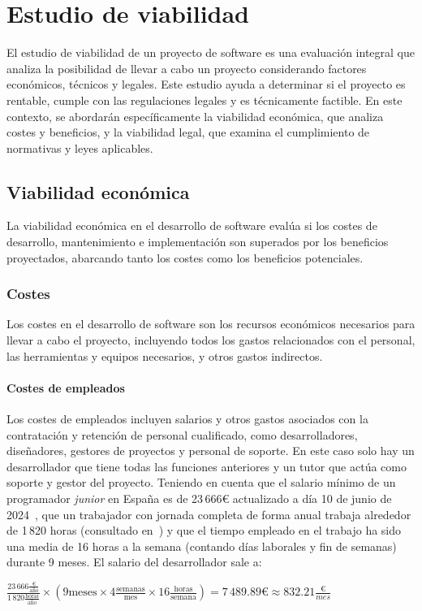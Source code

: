 \section{Estudio de viabilidad}
El estudio de viabilidad de un proyecto de software es una evaluación integral que analiza la posibilidad de llevar a cabo un proyecto considerando factores económicos, técnicos y legales. Este estudio ayuda a determinar si el proyecto es rentable, cumple con las regulaciones legales y es técnicamente factible. En este contexto, se abordarán específicamente la viabilidad económica, que analiza costes y beneficios, y la viabilidad legal, que examina el cumplimiento de normativas y leyes aplicables.

\subsection{Viabilidad económica}
La viabilidad económica en el desarrollo de software evalúa si los costes de desarrollo, mantenimiento e implementación son superados por los beneficios proyectados, abarcando tanto los costes como los beneficios potenciales.

\subsubsection{Costes}
Los costes en el desarrollo de software son los recursos económicos necesarios para llevar a cabo el proyecto, incluyendo todos los gastos relacionados con el personal, las herramientas y equipos necesarios, y otros gastos indirectos.

\paragraph{Costes de empleados}

Los costes de empleados incluyen salarios y otros gastos asociados con la contratación y retención de personal cualificado, como desarrolladores, diseñadores, gestores de proyectos y personal de soporte. En este caso solo hay un desarrollador que tiene todas las funciones anteriores y un tutor que actúa como soporte y gestor del proyecto. Teniendo en cuenta que el salario mínimo de un programador \textit{junior} en España es de 23\,666€ actualizado a día 10 de junio de 2024~\cite{salario}, que un trabajador con jornada completa de forma anual trabaja alrededor de 1\,820 horas (consultado en~\cite{jornadaAnual}) y que el tiempo  empleado en el trabajo ha sido una media de 16 horas a la semana (contando días laborales y fin de semanas) durante 9 meses. El salario del desarrollador sale a:
\begin{center}
	$ \frac{23\,666\frac{\text{€}}{\text{año}}}{1\,820\frac{\text{horas}}{\text{año}}} \times (9\text{meses} \times 4\frac{\text{semanas}}{\text{mes}} \times 16\frac{\text{horas}}{\text{semana}}) = 7\,489.89\text{€} \approx 832.21\frac{\text{€}}{mes}$
\end{center}

